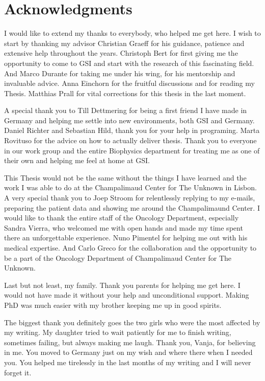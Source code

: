 

\chapter*{Acknowledgments}

I would like to extend my thanks to everybody, who helped me get here.
I wish to start by thanking my advisor Christian Graeff for his guidance, patience and extensive help throughout the years. 
Christoph Bert for first giving me the opportunity to come to GSI and start with the research of this fascinating field. And Marco Durante for taking me under his wing, for his mentorship and invaluable advice.  
Anna Einchorn for the fruitful discussions and for reading my Thesis. Matthias Prall for vital corrections for this thesis in the last moment.

A special thank you to Till Dettmering for being a first friend I have made in Germany and helping me settle into new environments, both GSI and Germany. Daniel Richter and Sebastian Hild, thank you for your help in programing.
Marta Rovituso for the advice on how to actually deliver thesis. 
Thank you to everyone in our work group and the entire Biophysics department for treating me as one of their own and helping me feel at home at GSI. 

This Thesis would not be the same without the things I have learned and the work I was able to do at the Champalimaud Center for The Unknown in Lisbon.
A very special thank you to Joep Stroom for relentlessly replying to my e-mails, preparing the patient data and showing me around the Champalimaund Center.
I would like to thank the entire staff of the Oncology Department, especially Sandra Vierra, who welcomed me with open hands and made my time spent there an unforgettable experience. 
Nuno Pimentel for helping me out with his medical expertise. And Carlo Greco for the collaboration and the opportunity to be a part of the Oncology Department of Champalimaud Center for The Unknown.

Last but not least, my family. Thank you parents for helping me get here. I would not have made it without your help and unconditional support. Making PhD was much easier with my brother keeping me up in good spirits.

The biggest thank you definitely goes the two girls who were the most affected by my writing. My daughter tried to wait patiently for me to finish writing, sometimes failing, but always making me laugh.
Thank you, Vanja, for believing in me. You moved to Germany just on my wish and where there when I needed you. You helped me tirelessly in the last months of my writing and I will never forget it. 


